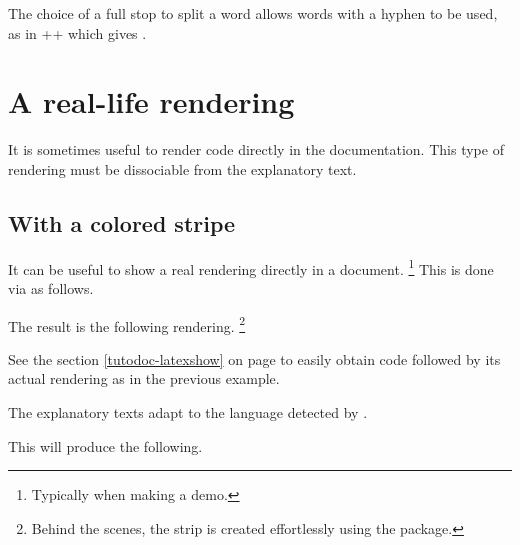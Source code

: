 \begin{tdocrem}
    The choice of a full stop to split a word allows words with a hyphen to be used, as in \tdocinlatex++ which gives .
\end{tdocrem}


\section{A real-life rendering}
\label{tutodoc-showcase}

It is sometimes useful to render code directly in the documentation. This type of rendering must be dissociable from the explanatory text.



\subsection{With a colored stripe}

\begin{tdocexa} 
    It can be useful to show a real rendering directly in a document.
    \footnote{
        Typically when making a demo.
    }
    This is done via  as follows.



    The result is the following rendering.
    \footnote{
        Behind the scenes, the strip is created effortlessly using the  package.
    }
\end{tdocexa}





\smallskip

\begin{tdocrem}
    See the section \ref{tutodoc-latexshow} on page \pageref{tutodoc-latexshow} to easily obtain code followed by its actual rendering as in the previous example.
\end{tdocrem}


\begin{tdocnote}
    The explanatory texts adapt to the language detected by \thisproj.
\end{tdocnote}




\begin{tdocexa}
    \leavevmode



    This will produce the following.

    \medskip

    

\end{tdocexa}


